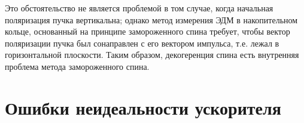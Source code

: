 Это обстоятельство не является проблемой в том случае, когда начальная
поляризация пучка вертикальна; однако метод измерения ЭДМ в
накопительном кольце, основанный
на принципе замороженного спина требует, чтобы вектор поляризации
пучка был сонаправлен с его вектором импульса, т.е. лежал в
горизонтальной плоскости. Таким образом, декогеренция спина есть
внутренняя проблема метода замороженного спина.



\section{Ошибки неидеальности ускорителя}



\clearpage
